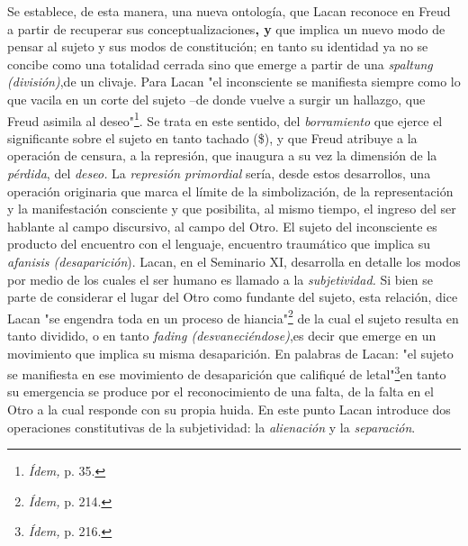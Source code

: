 \documentclass{book}
\begin{document}
Se establece, de esta manera, una nueva ontología, que Lacan reconoce en
Freud a partir de recuperar sus conceptualizaciones\textbf{, y} que
implica un nuevo modo de pensar al sujeto y sus modos de constitución;
en tanto su identidad ya no se concibe como una totalidad cerrada sino
que emerge a partir de una \emph{spaltung (división)},de un clivaje.
Para Lacan "el inconsciente se manifiesta siempre como lo que vacila en
un corte del sujeto --de donde vuelve a surgir un hallazgo, que Freud
asimila al deseo"\footnote{\emph{Ídem,} p. 35.}. Se trata en este
sentido, del \emph{borramiento} que ejerce el significante sobre el
sujeto en tanto tachado (\$), y que Freud atribuye a la operación de
censura, a la represión, que inaugura a su vez la dimensión de la
\emph{pérdida}, del \emph{deseo.} La \emph{represión primordial} sería,
desde estos desarrollos, una operación originaria que marca el límite de
la simbolización, de la representación y la manifestación consciente y
que posibilita, al mismo tiempo, el ingreso del ser hablante al campo
discursivo, al campo del Otro. El sujeto del inconsciente es producto
del encuentro con el lenguaje, encuentro traumático que implica su
\emph{afanisis (desaparición}). Lacan, en el Seminario XI, desarrolla en
detalle los modos por medio de los cuales el ser humano es llamado a la
\emph{subjetividad.} Si bien se parte de considerar el lugar del Otro
como fundante del sujeto, esta relación, dice Lacan "se engendra toda en
un proceso de hiancia"\footnote{\emph{Ídem,} p. 214.} de la cual el
sujeto resulta en tanto dividido, o en tanto \emph{fading
(desvaneciéndose)},es decir que emerge en un movimiento que implica su
misma desaparición. En palabras de Lacan: "el sujeto se manifiesta en
ese movimiento de desaparición que califiqué de letal"\footnote{\emph{Ídem,}
  p. 216.}en tanto su emergencia se produce por el reconocimiento de una
falta, de la falta en el Otro a la cual responde con su propia huida. En
este punto Lacan introduce dos operaciones constitutivas de la
subjetividad: la \emph{alienación} y la \emph{separación}.
\end{document}
